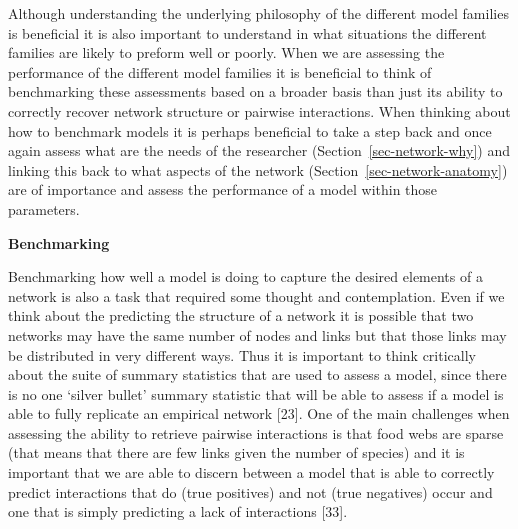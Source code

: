 \documentclass[
]{article}
\begin{document}
\begin{tcolorbox}[enhanced jigsaw, title=\textcolor{quarto-callout-note-color}{\faInfo}\hspace{0.5em}{Box 2 - Assessing model outputs}, breakable, rightrule=.15mm, colframe=quarto-callout-note-color-frame, colbacktitle=quarto-callout-note-color!10!white, arc=.35mm, leftrule=.75mm, toptitle=1mm, colback=white, toprule=.15mm, opacitybacktitle=0.6, opacityback=0, bottomtitle=1mm, titlerule=0mm, bottomrule=.15mm, left=2mm, coltitle=black]

Although understanding the underlying philosophy of the different model
families is beneficial it is also important to understand in what
situations the different families are likely to preform well or poorly.
When we are assessing the performance of the different model families it
is beneficial to think of benchmarking these assessments based on a
broader basis than just its ability to correctly recover network
structure or pairwise interactions. When thinking about how to benchmark
models it is perhaps beneficial to take a step back and once again
assess what are the needs of the researcher
(Section~\ref{sec-network-why}) and linking this back to what aspects of
the network (Section~\ref{sec-network-anatomy}) are of importance and
assess the performance of a model within those parameters.

\textbf{Benchmarking}

Benchmarking how well a model is doing to capture the desired elements
of a network is also a task that required some thought and
contemplation. Even if we think about the predicting the structure of a
network it is possible that two networks may have the same number of
nodes and links but that those links may be distributed in very
different ways. Thus it is important to think critically about the suite
of summary statistics that are used to assess a model, since there is no
one `silver bullet' summary statistic that will be able to assess if a
model is able to fully replicate an empirical network {[}23{]}. One of
the main challenges when assessing the ability to retrieve pairwise
interactions is that food webs are sparse (that means that there are few
links given the number of species) and it is important that we are able
to discern between a model that is able to correctly predict
interactions that do (true positives) and not (true negatives) occur and
one that is simply predicting a lack of interactions {[}33{]}.

\begin{figure}[H]


\end{figure}
\end{tcolorbox}
\end{document}
